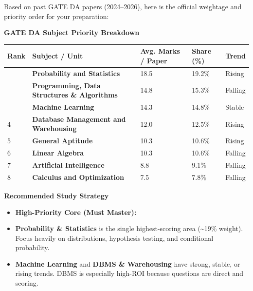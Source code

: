 \begin{tcolorbox}[enhanced,breakable,colback=blue!3,colframe=blue!30,boxrule=0.4pt,arc=2pt,left=6pt,right=6pt,title={PaperMind},fonttitle=\bfseries\small,coltitle=black,colbacktitle=blue!10]
\small Based on past GATE DA papers (2024–2026), here is the official weightage and priority order for your preparation:\par
\par\noindent\textbf{\textbf{GATE DA Subject Priority Breakdown}}\par
\begin{center}\small\begin{tabular}{@{}lllll@{}}\toprule
Rank & Subject / Unit & Avg. Marks / Paper & Share (\%) & Trend\\\midrule
 & \textbf{Probability and Statistics} & 18.5 & 19.2\% & Rising\\
 & \textbf{Programming, Data Structures \& Algorithms} & 14.8 & 15.3\% & Falling\\
 & \textbf{Machine Learning} & 14.3 & 14.8\% & Stable\\
4 & \textbf{Database Management and Warehousing} & 12.0 & 12.5\% & Rising\\
5 & \textbf{General Aptitude} & 10.3 & 10.6\% & Rising\\
6 & \textbf{Linear Algebra} & 10.3 & 10.6\% & Falling\\
7 & \textbf{Artificial Intelligence} & 8.8 & 9.1\% & Falling\\
8 & \textbf{Calculus and Optimization} & 7.5 & 7.8\% & Falling\\
\bottomrule\end{tabular}\end{center}
\par\smallskip
\par\noindent\textbf{\textbf{Recommended Study Strategy}}\par
\begin{itemize}[leftmargin=1.4em,itemsep=1pt]
\item \textbf{High-Priority Core (Must Master):}
\item \textbf{Probability \& Statistics} is the single highest-scoring area (\textasciitilde{}19\% weight). Focus heavily on distributions, hypothesis testing, and conditional probability.
\item \textbf{Machine Learning} and \textbf{DBMS \& Warehousing} have strong, stable, or rising trends. DBMS is especially high-ROI because questions are direct and scoring.
\end{itemize}

\end{tcolorbox}
